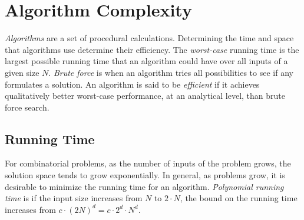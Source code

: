 \section{Algorithm Complexity}
\textit{Algorithms} are a set of procedural calculations.  Determining the time and space that algorithms use determine their efficiency.  The \textit{worst-case} running time is the largest possible running time that an algorithm could have over all inputs of a given size $N$.  \textit{Brute force} is when an algorithm tries all possibilities to see if any formulates a solution.  An algorithm is said to be \textit{efficient} if it achieves qualitatively better worst-case performance, at an analytical level, than brute force search. %

\subsection{Running Time}
For combinatorial problems, as the number of inputs of the problem grows, the solution space tends to grow exponentially.  In general, as problems grow, it is desirable to minimize the running time for an algorithm.   \textit{Polynomial running time} is if the input size increases from $N$ to $2\cdot N$, the bound on the running time increases from $c \cdot (2N)^d = c \cdot 2^d \cdot N^d$.  
